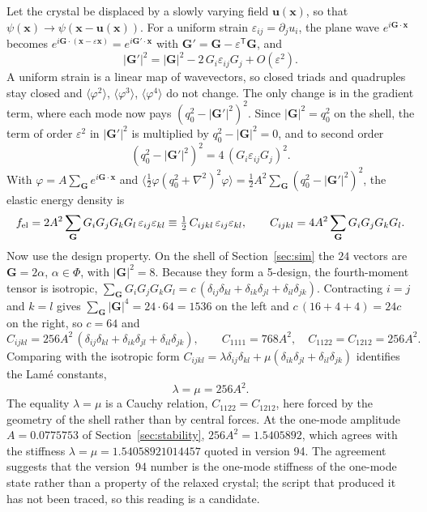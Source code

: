 \documentclass[a4paper,11pt]{article}
\numberwithin{equation}{section}
\theoremstyle{jsplain}
\theoremstyle{jsrem}
\begin{document}
Let the crystal be displaced by a slowly varying field $\mathbf{u}(\mathbf{x})$, so that $\psi(\mathbf{x})\to\psi(\mathbf{x}-\mathbf{u}(\mathbf{x}))$. For a uniform strain $\varepsilon_{ij}=\partial_ju_i$, the plane wave $e^{i\mathbf{G}\cdot\mathbf{x}}$ becomes $e^{i\mathbf{G}\cdot(\mathbf{x}-\varepsilon\mathbf{x})}=e^{i\mathbf{G}'\cdot\mathbf{x}}$ with $\mathbf{G}'=\mathbf{G}-\varepsilon^{\mathsf T}\mathbf{G}$, and
\[
|\mathbf{G}'|^2=|\mathbf{G}|^2-2\,G_i\varepsilon_{ij}G_j+O(\varepsilon^2).
\]
A uniform strain is a linear map of wavevectors, so closed triads and quadruples stay closed and $\langle\varphi^2\rangle$, $\langle\varphi^3\rangle$, $\langle\varphi^4\rangle$ do not change. The only change is in the gradient term, where each mode now pays $(q_0^2-|\mathbf{G}'|^2)^2$. Since $|\mathbf{G}|^2=q_0^2$ on the shell, the term of order $\varepsilon^2$ in $|\mathbf{G}'|^2$ is multiplied by $q_0^2-|\mathbf{G}|^2=0$, and to second order
\[
(q_0^2-|\mathbf{G}'|^2)^2=4\,(G_i\varepsilon_{ij}G_j)^2 .
\]
With $\varphi=A\sum_{\mathbf{G}}e^{i\mathbf{G}\cdot\mathbf{x}}$ and $\langle\tfrac12\varphi(q_0^2+\nabla^2)^2\varphi\rangle=\tfrac12A^2\sum_{\mathbf{G}}(q_0^2-|\mathbf{G}'|^2)^2$, the elastic energy density is
\begin{equation}\label{eq:fel}
f_{\rm el}=2A^2\sum_{\mathbf{G}}G_iG_jG_kG_l\,\varepsilon_{ij}\varepsilon_{kl}\equiv\tfrac12\,C_{ijkl}\,\varepsilon_{ij}\varepsilon_{kl},\qquad C_{ijkl}=4A^2\sum_{\mathbf{G}}G_iG_jG_kG_l .
\end{equation}
Now use the design property. On the shell of Section~\ref{sec:sim} the $24$ vectors are $\mathbf{G}=2\alpha$, $\alpha\in\Phi$, with $|\mathbf{G}|^2=8$. Because they form a 5-design, the fourth-moment tensor is isotropic, $\sum_{\mathbf{G}}G_iG_jG_kG_l=c\,(\delta_{ij}\delta_{kl}+\delta_{ik}\delta_{jl}+\delta_{il}\delta_{jk})$. Contracting $i=j$ and $k=l$ gives $\sum_{\mathbf{G}}|\mathbf{G}|^4=24\cdot64=1536$ on the left and $c\,(16+4+4)=24c$ on the right, so $c=64$ and
\begin{equation}\label{eq:Cijkl}
C_{ijkl}=256A^2\,(\delta_{ij}\delta_{kl}+\delta_{ik}\delta_{jl}+\delta_{il}\delta_{jk}),\qquad C_{1111}=768A^2,\quad C_{1122}=C_{1212}=256A^2 .
\end{equation}
Comparing with the isotropic form $C_{ijkl}=\lambda\delta_{ij}\delta_{kl}+\mu(\delta_{ik}\delta_{jl}+\delta_{il}\delta_{jk})$ identifies the Lamé constants,
\begin{equation}\label{eq:lame}
\lambda=\mu=256A^2 .
\end{equation}
The equality $\lambda=\mu$ is a Cauchy relation, $C_{1122}=C_{1212}$, here forced by the geometry of the shell rather than by central forces. At the one-mode amplitude $A=0.0775753$ of Section~\ref{sec:stability}, $256A^2=1.5405892$, which agrees with the stiffness $\lambda=\mu=1.54058921014457$ quoted in version 94. The agreement suggests that the version~94 number is the one-mode stiffness of the one-mode state rather than a property of the relaxed crystal; the script that produced it has not been traced, so this reading is a candidate.
\end{document}
